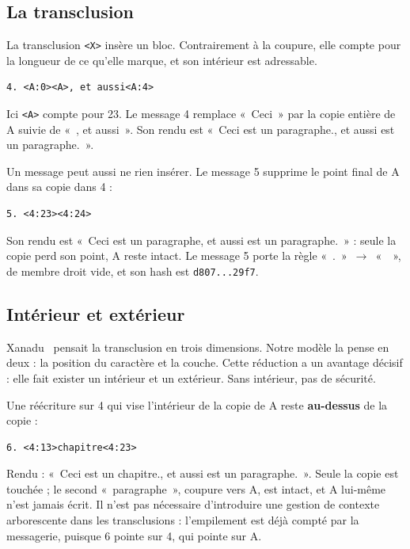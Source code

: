 \documentclass[11pt,a4paper]{article}
\newcommand{\cd}[1]{\texttt{#1}}
\begin{document}
\subsection{La transclusion}

La transclusion \cd{<X>} insère un bloc. Contrairement à la coupure, elle compte pour la longueur de ce qu'elle marque, et son intérieur est adressable.

\begin{Verbatim}
4. <A:0><A>, et aussi<A:4>
\end{Verbatim}

Ici \cd{<A>} compte pour 23. Le message 4 remplace «~Ceci~» par la copie entière de A suivie de «~, et aussi~». Son rendu est «~Ceci est un paragraphe., et aussi est un paragraphe.~».

Un message peut aussi ne rien insérer. Le message 5 supprime le point final de A dans sa copie dans 4 :

\begin{Verbatim}
5. <4:23><4:24>
\end{Verbatim}

Son rendu est «~Ceci est un paragraphe, et aussi est un paragraphe.~» : seule la copie perd son point, A reste intact. Le message 5 porte la règle «~.~»~$\to$~«~~», de membre droit vide, et son hash est \cd{d807...29f7}.

\subsection{Intérieur et extérieur}

Xanadu~\cite{nelson1981} pensait la transclusion en trois dimensions. Notre modèle la pense en deux : la position du caractère et la couche. Cette réduction a un avantage décisif : elle fait exister un intérieur et un extérieur. Sans intérieur, pas de sécurité.

Une réécriture sur 4 qui vise l'intérieur de la copie de A reste \textbf{au-dessus} de la copie :

\begin{Verbatim}
6. <4:13>chapitre<4:23>
\end{Verbatim}

Rendu : «~Ceci est un chapitre., et aussi est un paragraphe.~». Seule la copie est touchée ; le second «~paragraphe~», coupure vers A, est intact, et A lui-même n'est jamais écrit. Il n'est pas nécessaire d'introduire une gestion de contexte arborescente dans les transclusions : l'empilement est déjà compté par la messagerie, puisque 6 pointe sur 4, qui pointe sur A.
\end{document}
